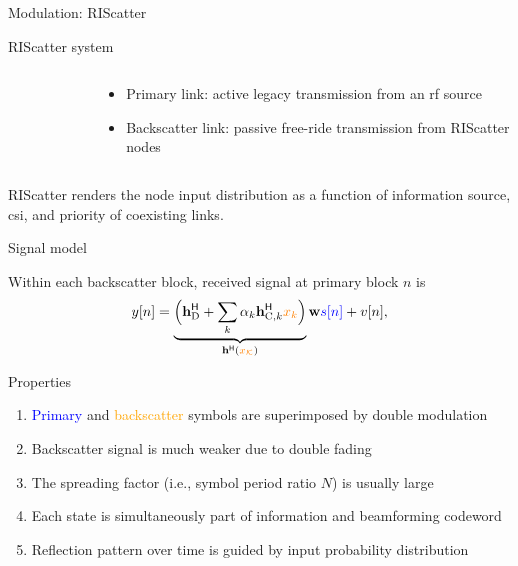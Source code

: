 \documentclass[presentation,xcolor={table},9pt]{beamer}
\begin{document}
\begin{section}{Modulation: RIScatter}
\begin{frame}{RIScatter system}
\begin{columns}
\begin{column}{0.4\textwidth}
\begin{figure}
{					}
					\label{fg:riscatter}
				\end{figure}
			\end{column}
			\begin{column}{0.5\textwidth}
				\begin{itemize}
						\item {\color{blue}Primary link:} active legacy transmission from an \gls{rf} source
						\item {\color{orange}Backscatter link:} passive free-ride transmission from RIScatter nodes
				\end{itemize}
			\end{column}
		\end{columns}
		RIScatter renders the node input distribution as a function of information source, \gls{csi}, and priority of coexisting links.
	\end{frame}

	\begin{frame}{Signal model}
		\begin{figure}[H]
			\centering
			\def\svgwidth{0.6\columnwidth}
			
			\label{fg:riscatter_network}
		\end{figure}
		Within each backscatter block, received signal at primary block $n$ is
		\begin{equation*}
			y[n] = \underbrace{\Bigl(\mathbf{h}_{\text{D}}^\mathsf{H} + \sum_{k} \alpha_k \mathbf{h}_{\text{C},k}^\mathsf{H} \textcolor{orange}{x_k}\Bigr)}_{\mathbf{h}^\mathsf{H}(\textcolor{orange}{x_{\mathcal{K}}})} \mathbf{w} \textcolor{blue}{s[n]} + v[n],
		\end{equation*}
		\vspace{-0.25cm}
		\begin{block}{Properties}
			\begin{enumerate}
				\item \textcolor{blue}{Primary} and \textcolor{orange}{backscatter} symbols are superimposed by {double modulation}
				\item Backscatter signal is much weaker due to {double fading}
				\item The spreading factor (i.e., symbol period ratio $N$) is usually large
				\item Each {state} is simultaneously part of information and beamforming {codeword}
				\item Reflection pattern over time is guided by input probability distribution
			\end{enumerate}
		\end{block}
	\end{frame}


\end{section}
\end{document}

